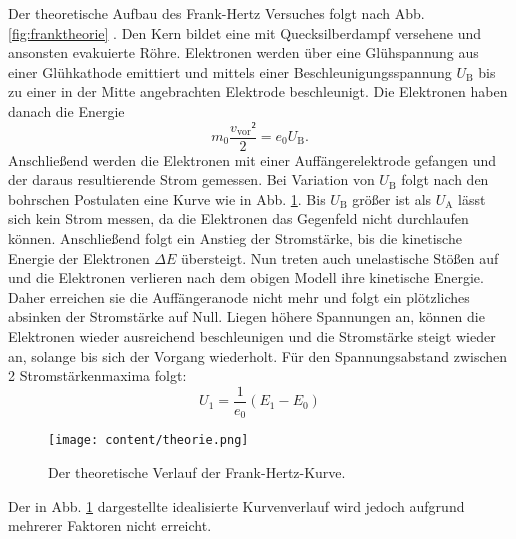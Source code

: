 Der theoretische Aufbau des Frank-Hertz Versuches folgt nach Abb.
\ref{fig:franktheorie} . Den Kern bildet eine mit Quecksilberdampf versehene und ansonsten evakuierte
Röhre. Elektronen werden über eine Glühspannung aus einer Glühkathode emittiert
und mittels einer Beschleunigungsspannung $U_\text{B}$ bis zu einer in der Mitte angebrachten
Elektrode beschleunigt. Die Elektronen haben danach die Energie
\begin{equation}
  m_0 \frac{v_\text{vor}²}{2} = e_0 U_\text{B}\text{.}\label{eq:ekin}
  \end{equation}
   Anschließend werden die Elektronen mit einer Auffängerelektrode
gefangen und der daraus resultierende Strom gemessen.
Bei Variation von $U_\text{B}$ folgt nach den bohrschen Postulaten eine
 Kurve wie in Abb. \ref{fig:Graphtheorie}.
 Bis $U_\text{B}$ größer ist als $U_\text{A}$ lässt sich kein Strom messen,
 da die Elektronen das Gegenfeld nicht durchlaufen können.
 Anschließend folgt ein Anstieg der Stromstärke,  bis die kinetische Energie
 der Elektronen $\Delta E$ übersteigt. Nun treten auch unelastische
 Stößen auf und die Elektronen verlieren nach dem obigen Modell ihre kinetische Energie.
  Daher erreichen sie die Auffängeranode nicht mehr und folgt ein plötzliches
  absinken der Stromstärke auf Null. Liegen höhere
 Spannungen an, können die Elektronen wieder ausreichend beschleunigen und die Stromstärke steigt
 wieder an, solange bis sich der Vorgang wiederholt.
 Für den Spannungsabstand zwischen 2 Stromstärkenmaxima folgt:
 \begin{equation}
   U_1 = \frac{1}{e_0}\left( E_1 - E_0 \right)\label{eq:udiff}
   \end{equation}


   \begin{figure}
   	\centering
   	\caption{Der theoretische Verlauf der Frank-Hertz-Kurve.}
   	\texttt{[image: content/theorie.png]}
   	\label{fig:Graphtheorie}
   \end{figure}



Der in Abb. \ref{fig:Graphtheorie} dargestellte idealisierte Kurvenverlauf wird jedoch
aufgrund mehrerer Faktoren nicht erreicht.


